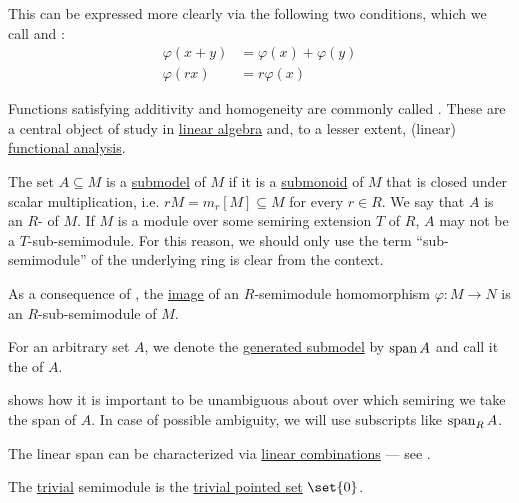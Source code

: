 \begin{definition}
\begin{thmenum}[resume=def:semimodule]
    This can be expressed more clearly via the following two conditions, which we call  and :
    \begin{align}
      \varphi(x + y) &= \varphi(x) + \varphi(y) \label{eq:def:semimodule/homomorphism/additive} \\
         \varphi(rx) &= r \varphi(x) \label{eq:def:semimodule/homomorphism/homogeneity}
    \end{align}

    Functions satisfying additivity and homogeneity are commonly called . These are a central object of study in \hyperref[sec:linear_algebra]{linear algebra} and, to a lesser extent, (linear) \hyperref[sec:functional_analysis]{functional analysis}.

     The set \( A \subseteq M \) is a \hyperref[thm:substructure_is_model]{submodel} of \( M \) if it is a \hyperref[def:monoid/submodel]{submonoid} of \( M \) that is closed under scalar multiplication, i.e. \( rM = m_r[M] \subseteq M \) for every \( r \in R \). We say that \( A \) is an \( R \)- of \( M \). If \( M \) is a module over some semiring extension \( T \) of \( R \), \( A \) may not be a \( T \)-sub-semimodule. For this reason, we should only use the term \enquote{sub-semimodule} of the underlying ring is clear from the context.

    As a consequence of , the \hyperref[def:multi_valued_function/image]{image} of an \( R \)-semimodule homomorphism \( \varphi: M \to N \) is an \( R \)-sub-semimodule of \( M \).

    For an arbitrary set \( A \), we denote the \hyperref[def:first_order_generated_substructure]{generated submodel} by \( \operatorname{span}{ A } \) and call it the  of \( A \).

     shows how it is important to be unambiguous about over which semiring we take the span of \( A \). In case of possible ambiguity, we will use subscripts like \( \operatorname{span}_R A \).

    The linear span can be characterized via \hyperref[rem:linear_combinations]{linear combinations} --- see .

     The \hyperref[thm:substructures_form_complete_lattice/bottom]{trivial} semimodule is the \hyperref[rem:pointed_set/trivial]{trivial pointed set} \( \set{ 0 } \).


\end{thmenum}
\end{definition}
